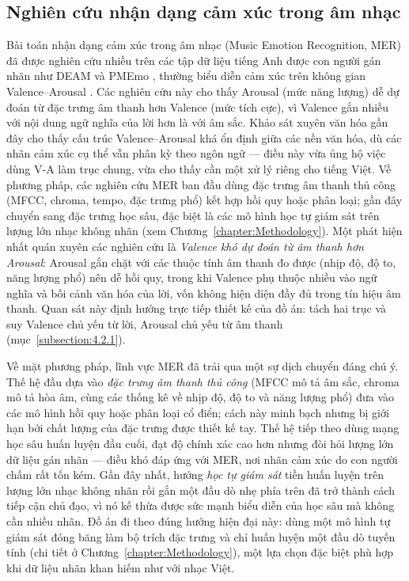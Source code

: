 \documentclass[../DoAn.tex]{subfiles}
\begin{document}
\subsection{Nghiên cứu nhận dạng cảm xúc trong âm nhạc}
\label{subsection:2.1.2}
Bài toán nhận dạng cảm xúc trong âm nhạc (Music Emotion Recognition, MER) \cite{yang2012mer} đã được nghiên cứu nhiều trên các tập dữ liệu tiếng Anh được con người gán nhãn như DEAM \cite{aljanaki2017deam} và PMEmo \cite{zhang2018pmemo}, thường biểu diễn cảm xúc trên không gian Valence--Arousal \cite{russell1980circumplex}. Các nghiên cứu này cho thấy Arousal (mức năng lượng) dễ dự đoán từ đặc trưng âm thanh hơn Valence (mức tích cực), vì Valence gắn nhiều với nội dung ngữ nghĩa của lời hơn là với âm sắc. Khảo sát xuyên văn hóa gần đây cho thấy cấu trúc Valence--Arousal khá ổn định giữa các nền văn hóa, dù các nhãn cảm xúc cụ thể vẫn phân kỳ theo ngôn ngữ \cite{lee2025globalmood} --- điều này vừa ủng hộ việc dùng V-A làm trục chung, vừa cho thấy cần một xử lý riêng cho tiếng Việt. Về phương pháp, các nghiên cứu MER ban đầu dùng đặc trưng âm thanh thủ công (MFCC, chroma, tempo, đặc trưng phổ) kết hợp hồi quy hoặc phân loại; gần đây chuyển sang đặc trưng học sâu, đặc biệt là các mô hình học tự giám sát trên lượng lớn nhạc không nhãn (xem Chương~\ref{chapter:Methodology}). Một phát hiện nhất quán xuyên các nghiên cứu là \textit{Valence khó dự đoán từ âm thanh hơn Arousal}: Arousal gắn chặt với các thuộc tính âm thanh đo được (nhịp độ, độ to, năng lượng phổ) nên dễ hồi quy, trong khi Valence phụ thuộc nhiều vào ngữ nghĩa và bối cảnh văn hóa của lời, vốn không hiện diện đầy đủ trong tín hiệu âm thanh. Quan sát này định hướng trực tiếp thiết kế của đồ án: tách hai trục và suy Valence chủ yếu từ lời, Arousal chủ yếu từ âm thanh (mục~\ref{subsection:4.2.1}).

Về mặt phương pháp, lĩnh vực MER đã trải qua một sự dịch chuyển đáng chú ý. Thế hệ đầu dựa vào \textit{đặc trưng âm thanh thủ công} (MFCC mô tả âm sắc, chroma mô tả hòa âm, cùng các thống kê về nhịp độ, độ to và năng lượng phổ) đưa vào các mô hình hồi quy hoặc phân loại cổ điển; cách này minh bạch nhưng bị giới hạn bởi chất lượng của đặc trưng được thiết kế tay. Thế hệ tiếp theo dùng mạng học sâu huấn luyện đầu cuối, đạt độ chính xác cao hơn nhưng đòi hỏi lượng lớn dữ liệu gán nhãn --- điều khó đáp ứng với MER, nơi nhãn cảm xúc do con người chấm rất tốn kém. Gần đây nhất, hướng \textit{học tự giám sát} tiền huấn luyện trên lượng lớn nhạc không nhãn rồi gắn một đầu dò nhẹ phía trên đã trở thành cách tiếp cận chủ đạo, vì nó kế thừa được sức mạnh biểu diễn của học sâu mà không cần nhiều nhãn. Đồ án đi theo đúng hướng hiện đại này: dùng một mô hình tự giám sát đóng băng làm bộ trích đặc trưng và chỉ huấn luyện một đầu dò tuyến tính (chi tiết ở Chương~\ref{chapter:Methodology}), một lựa chọn đặc biệt phù hợp khi dữ liệu nhãn khan hiếm như với nhạc Việt.
\end{document}
